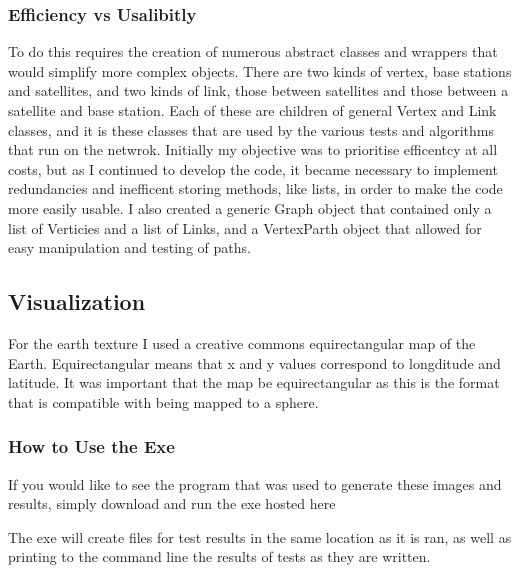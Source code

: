 \documentclass[12pt]{article}
\begin{document}
\subsubsection{Efficiency vs Usalibitly}
To do this requires the creation of numerous abstract classes and wrappers that would simplify more complex objects. There are two kinds of vertex, base stations and satellites, and two kinds of link, those between satellites and those between a satellite and base station. Each of these are children of general Vertex and Link classes, and it is these classes that are used by the various tests and algorithms that run on the netwrok. Initially my objective was to prioritise efficentcy at all costs, but as I continued to develop the code, it became necessary to implement redundancies and inefficent storing methods, like lists, in order to make the code more easily usable. I also created a generic Graph object that contained only a list of Verticies and a list of Links, and a VertexParth object that allowed for easy manipulation and testing of paths.

\subsection{Visualization}

For the earth texture I used a creative commons equirectangular map of the Earth. Equirectangular means that x and y values correspond to longditude and latitude. It was important that the map be equirectangular as this is the format that is compatible with being mapped to a sphere. \cite{Map}


\subsubsection{How to Use the Exe}

If you would like to see the program that was used to generate these images and results, simply download and run the exe hosted here %

The exe will create files for test results in the same location as it is ran, as well as printing to the command line the results of tests as they are written.
\end{document}
